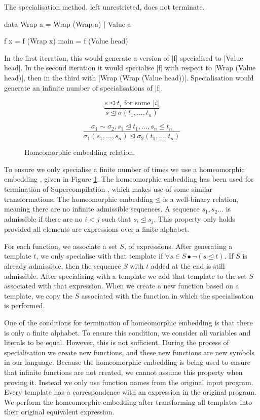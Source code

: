 \documentclass[preprint]{sigplanconf}
\begin{document}
The specialisation method, left unrestricted, does not terminate.

\begin{example}
\begin{code}
data Wrap a  =  Wrap (Wrap a)
             |  Value a

f x = f (Wrap x)
main = f (Value head)
\end{code}

In the first iteration, this would generate a version of |f| specialised to |Value head|. In the second iteration it would specialise |f| with respect to |Wrap (Value head)|, then in the third with |Wrap (Wrap (Value head))|. Specialisation would generate an infinite number of specialisations of |f|.
\end{example}

\begin{figure}
\[\frac{s \unlhd t_i \text{ for some } |i|}{s \unlhd \sigma(t_1,\ldots,t_n)} \]

\[\frac{\sigma_1 \sim \sigma_2,
        s_1 \unlhd t_1, \ldots , s_n \unlhd t_n}
       {\sigma_1 (s_1,\ldots,s_n) \unlhd \sigma_2 (t_1,\ldots,t_n)} \]
\caption{Homeomorphic embedding relation.}
\label{fig:homeomorphic}
\end{figure}

To ensure we only specialise a finite number of times we use a homeomorphic embedding \cite{leuschel:homeomorphic}, given in Figure \ref{fig:homeomorphic}. The homeomorphic embedding has been used for termination of Supercompilation \cite{sorensen:supercompilation}, which makes use of some similar transformations. The homeomorphic embedding $\unlhd$ is a well-binary relation, meaning there are no infinite admissible sequences. A sequence $s_1,s_2 \ldots$ is admissible if there are no $i < j$ such that $s_i \unlhd s_j$. This property only holds provided all elements are expressions over a finite alphabet.

For each function, we associate a set $S$, of expressions. After generating a template $t$, we only specialise with that template if $\forall s \in S \bullet \neg(s \unlhd t)$. If $S$ is already admissible, then the sequence $S$ with $t$ added at the end is still admissible. After specialising with a template we add that template to the set $S$ associated with that expression. When we create a new function based on a template, we copy the $S$ associated with the function in which the specialisation is performed.

One of the conditions for termination of homeomorphic embedding is that there is only a finite alphabet. To ensure this condition, we consider all variables and literals to be equal. However, this is not sufficient. During the process of specialisation we create new functions, and these new functions are new symbols in our language. Because the homeomorphic embedding is being used to ensure that infinite functions are not created, we cannot assume this property when proving it. Instead we only use function names from the original input program. Every template has a correspondence with an expression in the original program. We perform the homeomorphic embedding after transforming all templates into their original equivalent expression.
\end{document}
